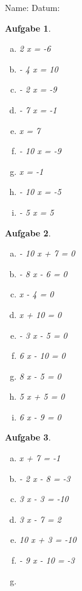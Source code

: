 \documentclass[12pt,fleqn]{article}
\theoremstyle{aufg}
\newtheorem{aufgabe}{Aufgabe}
\theoremstyle{bsp}
\begin{document}
 
    \begin{flushleft}
Name: \hspace{12cm} Datum:\begin{aufgabe} ~ \\ 
\begin{multicols}{3} 
\begin{enumerate}[a)] 
\item 
2 x = -6
\item 
- 4 x = 10
\item 
- 2 x = -9
\item 
- 7 x = -1
\item 
x = 7
\item 
- 10 x = -9
\item 
x = -1
\item 
- 10 x = -5
\item 
- 5 x = 5
\end{enumerate} 
\end{multicols} 
\end{aufgabe} 
\begin{aufgabe} ~ \\ 
\begin{multicols}{3} 
\begin{enumerate}[a)] 
\item 
- 10 x + 7 = 0
\item 
- 8 x - 6 = 0
\item 
x - 4 = 0
\item 
x + 10 = 0
\item 
- 3 x - 5 = 0
\item 
6 x - 10 = 0
\item 
8 x - 5 = 0
\item 
5 x + 5 = 0
\item 
6 x - 9 = 0
\end{enumerate} 
\end{multicols} 
\end{aufgabe} 
\begin{aufgabe} ~ \\ 
\begin{multicols}{3} 
\begin{enumerate}[a)] 
\item 
x + 7 = -1
\item 
- 2 x - 8 = -3
\item 
3 x - 3 = -10
\item 
3 x - 7 = 2
\item 
10 x + 3 = -10
\item 
- 9 x - 10 = -3
\item 

\end{enumerate}
\end{multicols}
\end{aufgabe}
\end{flushleft}
\end{document}
